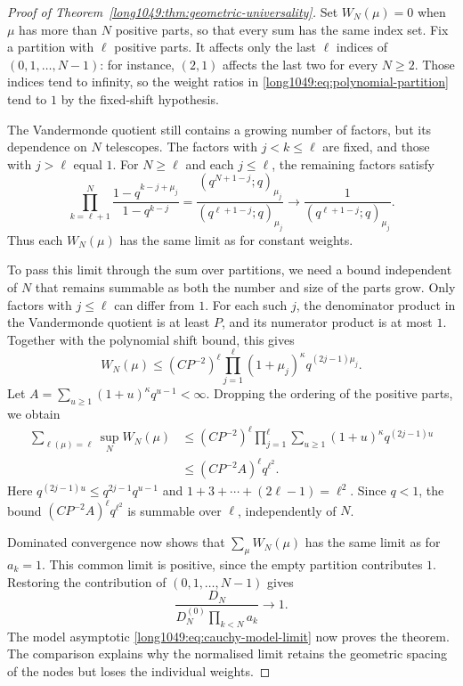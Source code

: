 \documentclass[11pt]{article}
\begin{document}
\begin{proof}[Proof of Theorem~\ref{long1049:thm:geometric-universality}]
Set $W_N(\mu)=0$ when $\mu$ has more than $N$ positive parts,
so that every sum has the same index set. Fix a partition with
$\ell$ positive parts. It affects only the last $\ell$ indices
of $(0,1,\ldots,N-1)$: for instance, $(2,1)$ affects the last two
for every $N\ge2$. Those indices tend to infinity, so the weight
ratios in \eqref{long1049:eq:polynomial-partition} tend to $1$ by the fixed-shift hypothesis.

The Vandermonde quotient still contains a growing number of factors,
but its dependence on $N$ telescopes. The factors with $j<k\le\ell$
are fixed, and those with $j>\ell$ equal $1$. For $N\ge\ell$ and
each $j\le\ell$, the remaining factors satisfy
\begin{equation}\label{long1049:eq:partition-tail}
 \prod_{k=\ell+1}^{N}
 \frac{1-q^{k-j+\mu_j}}{1-q^{k-j}}
 =\frac{(q^{N+1-j};q)_{\mu_j}}{(q^{\ell+1-j};q)_{\mu_j}}
 \longrightarrow\frac1{(q^{\ell+1-j};q)_{\mu_j}}.
\end{equation}
Thus each $W_N(\mu)$ has the same limit as for constant weights.

To pass this limit through the sum over partitions, we need a bound
independent of $N$ that remains summable as both the number and size
of the parts grow. Only factors with $j\le\ell$ can differ from $1$.
For each such $j$, the denominator product in the Vandermonde
quotient is at least $P$, and its numerator product is at most $1$.
Together with the polynomial shift bound, this gives
\[
 W_N(\mu)\le(CP^{-2})^\ell
 \prod_{j=1}^\ell(1+\mu_j)^\kappa q^{(2j-1)\mu_j}.
\]
Let $A=\sum_{u\ge1}(1+u)^\kappa q^{u-1}<\infty$.
Dropping the ordering of the positive parts, we obtain
\begin{align*}
 \sum_{\ell(\mu)=\ell}\sup_N W_N(\mu)
 &\le(CP^{-2})^\ell\prod_{j=1}^\ell
       \sum_{u\ge1}(1+u)^\kappa q^{(2j-1)u}\\
 &\le(CP^{-2}A)^\ell q^{\ell^2}.
\end{align*}
Here $q^{(2j-1)u}\le q^{2j-1}q^{u-1}$ and
$1+3+\cdots+(2\ell-1)=\ell^2$. Since $q<1$, the bound
$(CP^{-2}A)^\ell q^{\ell^2}$ is summable over $\ell$,
independently of $N$.

Dominated convergence now shows that $\sum_\mu W_N(\mu)$ has
the same limit as for $a_k=1$. This common limit is positive, since the
empty partition contributes $1$. Restoring the contribution of $(0,1,\ldots,N-1)$ gives
\[
 \frac{D_N}{D_N^{(0)}\prod_{k<N}a_k}\longrightarrow1.
\]
The model asymptotic \eqref{long1049:eq:cauchy-model-limit} now proves
the theorem. The comparison explains why the normalised limit
retains the geometric spacing of the nodes but loses the individual
weights.
\end{proof}
\end{document}
